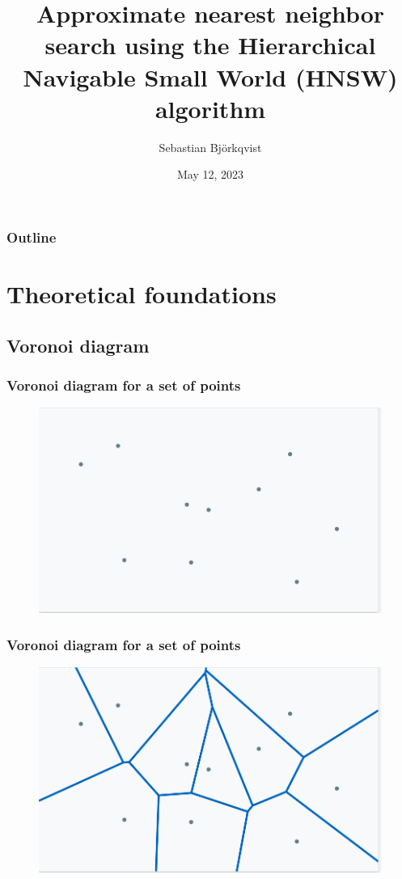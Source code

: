 \documentclass{beamer}
\title{Approximate nearest neighbor search using the Hierarchical Navigable Small World (HNSW) algorithm}
\author{Sebastian Bj{\"o}rkqvist}
\institute{Lead AI Developer, IPRally}
\date[12.05.2023]{May 12, 2023}
\begin{document}

\frame{\titlepage}


\begin{frame}
\frametitle{Outline}
  \tableofcontents
\end{frame}
\section{Theoretical foundations}
\subsection{Voronoi diagram}
  \begin{frame}
    \frametitle{Voronoi diagram for a set of points}  
  \begin{figure}[original_points]
    \vspace*{-0.1cm}
  	\includegraphics[scale=0.3]{original_points} 	
  \end{figure} 
  \end{frame}
  \begin{frame}
    \frametitle{Voronoi diagram for a set of points}  
  \begin{figure}[voronoi_diagram]
    \vspace*{-0.1cm}
  	\includegraphics[scale=0.3]{voronoi_diagram} 	
  \end{figure} 
  \end{frame} 
\end{document}
